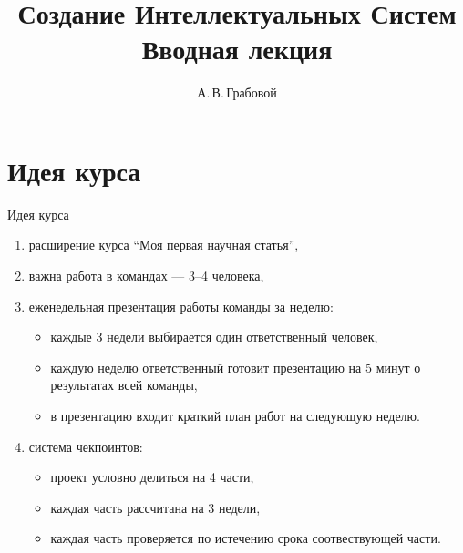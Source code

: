 \documentclass[10pt,pdf,hyperref={unicode}]{beamer}
\title[Вводная лекция]{Создание Интеллектуальных Систем \\ Вводная лекция}
\author{А.\,В.\,Грабовой}
\institute[]{Московский физико-технический институт}
\begin{document}
\begin{frame}
\titlepage
\end{frame}

\section{Идея курса}
\begin{frame}{Идея курса}
\bigskip
\begin{enumerate}[1)]
\justifying
\item расширение курса ``Моя первая научная статья'',
\item важна работа в командах --- 3--4 человека,
\item еженедельная презентация работы команды за неделю:
    \begin{itemize}
    \justifying
        \item каждые 3 недели выбирается один ответственный человек,
        \item каждую неделю ответственный готовит презентацию на 5 минут о результатах всей команды,
        \item в презентацию входит краткий план работ на следующую неделю.
    \end{itemize}
\item система чекпоинтов:
    \begin{itemize}
    \justifying
        \item проект условно делиться на 4 части,
        \item каждая часть рассчитана на 3 недели,
        \item каждая часть проверяется по истечению срока соотвествующей части.
    \end{itemize}
\end{enumerate}

\end{frame}

\end{document}
